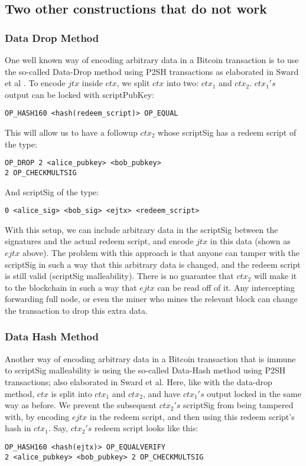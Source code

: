 \subsection{Two other constructions that do not work}

\subsubsection{Data Drop Method}
One well known way of encoding arbitrary data in a Bitcoin transaction is to use the so-called Data-Drop method using P2SH transactions as elaborated in Sward et al \cite{sward2018data}. To encode $\mathit{jtx}$ inside $\mathit{ctx}$, we split $\mathit{ctx}$ into two: $\mathit{ctx_1}$ and $\mathit{ctx_2}$. $\mathit{ctx_1's}$ output can be locked with scriptPubKey:
\begin{verbatim}
OP_HASH160 <hash(redeem_script)> OP_EQUAL
\end{verbatim}

This will allow us to have a followup $\mathit{ctx_2}$ whose scriptSig has a redeem script of the type:
\begin{verbatim}
OP_DROP 2 <alice_pubkey> <bob_pubkey>
2 OP_CHECKMULTSIG
\end{verbatim}

And scriptSig of the type:
\noindent
\begin{verbatim}
0 <alice_sig> <bob_sig> <ejtx> <redeem_script>
\end{verbatim}

With this setup, we can include arbitrary data in the scriptSig between the signatures and the actual redeem script, and encode $\mathit{jtx}$ in this data (shown as $\mathit{ejtx}$ above). The problem with this approach is that anyone can tamper with the scriptSig in such a way that this arbitrary data is changed, and the redeem script is still valid (scriptSig malleability). There is no guarantee that $\mathit{ctx_2}$ will make it to the blockchain in such a way that $\mathit{ejtx}$ can be read off of it. Any intercepting forwarding full node, or even the miner who mines the relevant block can change the transaction to drop this extra data.

\subsubsection{Data Hash Method}
\sloppy
Another way of encoding arbitrary data in a Bitcoin transaction that is immune to scriptSig malleability is using the so-called Data-Hash method using P2SH transactions; also elaborated in Sward et al\cite{sward2018data}. Here, like with the data-drop method, $\mathit{ctx}$ is split into $\mathit{ctx_1}$ and $\mathit{ctx_2}$, and have $\mathit{ctx_1's}$ output locked in the same way as before. We prevent the subsequent $\mathit{ctx_2's}$ scriptSig from being tampered with, by encoding $\mathit{ejtx}$ in the redeem script, and then using this redeem script's hash in $\mathit{ctx_1}$. Say, $\mathit{ctx_2's}$ redeem script looks like this: 
\begin{verbatim}
OP_HASH160 <hash(ejtx)> OP_EQUALVERIFY
2 <alice_pubkey> <bob_pubkey> 2 OP_CHECKMULTSIG
\end{verbatim}

